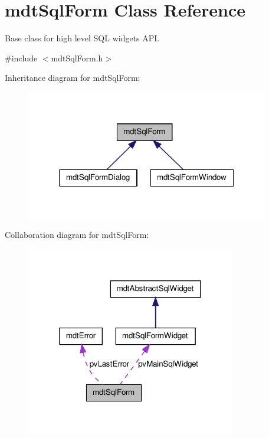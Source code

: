 \hypertarget{classmdt_sql_form}{
\section{mdtSqlForm Class Reference}
\label{classmdt_sql_form}
}


Base class for high level SQL widgets API.  




{\ttfamily \#include $<$mdtSqlForm.h$>$}



Inheritance diagram for mdtSqlForm:\nopagebreak
\begin{figure}[H]
\begin{center}
\leavevmode
\includegraphics[width=300pt]{classmdt_sql_form__inherit__graph}
\end{center}
\end{figure}


Collaboration diagram for mdtSqlForm:
\nopagebreak
\begin{figure}[H]
\begin{center}
\leavevmode
\includegraphics[width=259pt]{classmdt_sql_form__coll__graph}
\end{center}
\end{figure}
